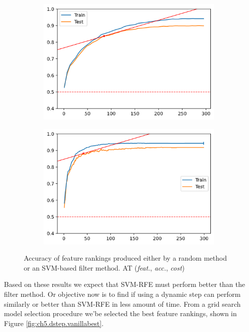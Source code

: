 \begin{figure}[H]
    \centering
    \begin{subfigure}[b]{0.4\linewidth}
        \includegraphics[width=\linewidth]{img/ch5/dstep/random.png}
    \end{subfigure}
    \begin{subfigure}[b]{0.4\linewidth}
        \includegraphics[width=\linewidth]{img/ch5/dstep/filter.png}
    \end{subfigure}
    \caption{Accuracy of feature rankings produced either by a random method or an SVM-based filter method. AT (\emph{feat.}, \emph{acc.}, \emph{cost})}
    \label{fig:ch5.dstep.init}
\end{figure}

Based on these results we expect that SVM-RFE must perform better than the filter method. Or objective now is to find if using a dynamic step can perform similarly or better than SVM-RFE in less amount of time. From a grid search model selection procedure we'be selected the best feature rankings, shown in Figure \ref{fig:ch5.dstep.vanillabest}.

